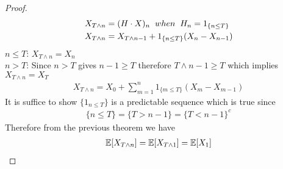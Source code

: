 \documentclass[a4paper,10pt,english]{article}
\begin{document}
\begin{proof}
\begin{align*}
    X_{T\wedge n}&= (H\cdot X)_n\hspace{2 mm} when\hspace{2 mm} H_n=1_{\{n\leq T\}}\\
    X_{T \wedge n}&= X_{T\wedge n-1}+1_{\{n \leq T\}}(X_n-X_{n-1})\\
\end{align*}
 $n\leq T$:\hspace{2 mm}  $X_{T\wedge n}= X_n$\\
 $n>T$: Since $n>T$ gives $n-1\geq T$ therefore $T\wedge n-1\geq T$ which implies $X_{T\wedge n}=X_{T}$ \\
 \begin{align*}
     X_{T\wedge n}= X_0 +  \sum_{m=1}^{n} 1_{\{m\leq T\}}(X_m-X_{m-1})
 \end{align*}
     It is suffice to show $\{1_{n\leq T}\}$ is a predictable sequence which is true since 
  \begin{align*}
  \{n\leq T\}=\{T>n-1\}=\{T<n-1\}^c
  \end{align*}
  Therefore from the previous theorem we have 
  \begin{align*}
      \mathbb{E}[X_{T\wedge n}]=\mathbb{E}[X_{T\wedge 1}]=\mathbb{E}[X_{1}]
  \end{align*}


\end{proof}
\end{document}
